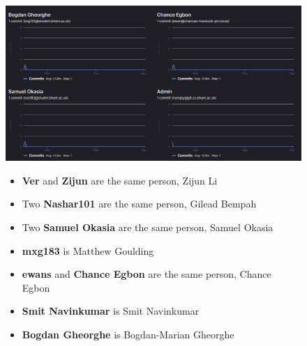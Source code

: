\documentclass[a4paper]{article}
\begin{document}
\begin{figure}[H]
    \centering
	\begin{minipage}{0.49\textwidth}
		\centering
		\includegraphics[width=\linewidth]{./image/Contributor_3.png}
	\end{minipage}
	\begin{minipage}{0.49\textwidth}
		\footnotesize
		\begin{itemize}
			\item \textbf{Ver} and \textbf{Zijun} are the same person, Zijun Li\\
			\item Two \textbf{Nashar101} are the same person, Gilead Bempah\\
			\item Two \textbf{Samuel Okasia} are the same person, Samuel Okasia\\
			\item \textbf{mxg183} is Matthew Goulding\\
			\item \textbf{ewans} and  \textbf{Chance Egbon} are the same person, Chance Egbon\\
			\item \textbf{Smit Navinkumar} is Smit Navinkumar\\
			\item \textbf{Bogdan Gheorghe} is Bogdan-Marian Gheorghe\\
		\end{itemize}
	\end{minipage}
\end{figure}
\end{document}
